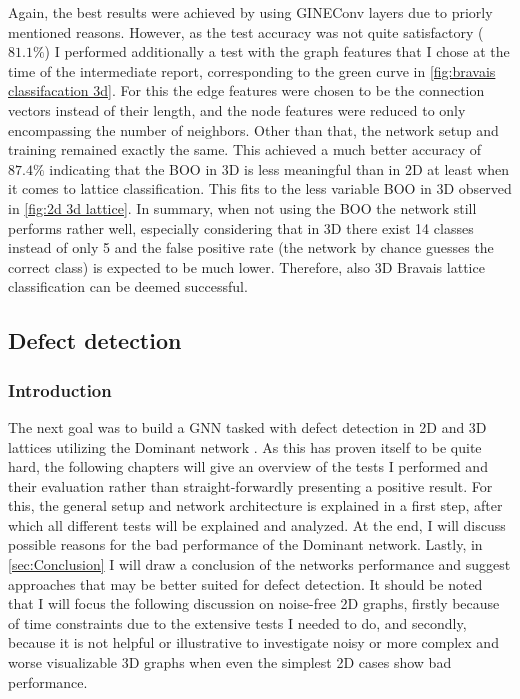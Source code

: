 \documentclass[11pt,a4paper]{article}
\begin{document}
Again, the best results were achieved by using GINEConv layers due to priorly mentioned reasons. 
However, as the test accuracy was not quite satisfactory ($81.1\%$) I performed additionally a test with the graph features that I chose at the time of the intermediate report, corresponding to the green curve in \autoref{fig:bravais classifacation 3d}. 
For this the edge features were chosen to be the connection vectors instead of their length, and the node features were reduced to only encompassing the number of neighbors. 
Other than that, the network setup and training remained exactly the same. 
This achieved a much better accuracy of $87.4\%$ indicating that the BOO in 3D is less meaningful than in 2D at least when it comes to lattice classification. 
This fits to the less variable BOO in 3D observed in \autoref{fig:2d 3d lattice}. 
In summary, when not using the BOO the network still performs rather well, especially considering that in 3D there exist 14 classes instead of only 5 and the false positive rate (the network by chance guesses the correct class) is expected to be much lower. 
Therefore, also 3D Bravais lattice classification can be deemed successful. 

\subsection{Defect detection}
\label{ssec:Defect detection}
\subsubsection{Introduction}
The next goal was to build a GNN tasked with defect detection in 2D and 3D lattices utilizing the Dominant network \cite{dingDeepAnomalyDetection2019}. 
As this has proven itself to be quite hard, the following chapters will give an overview of the tests I performed and their evaluation rather than straight-forwardly presenting a positive result. 
For this, the general setup and network architecture is explained in a first step, after which all different tests will be explained and analyzed. 
At the end, I will discuss possible reasons for the bad performance of the Dominant network.
Lastly, in \autoref{sec:Conclusion} I will draw a conclusion of the networks performance and suggest approaches that may be better suited for defect detection. 
It should be noted that I will focus the following discussion on noise-free 2D graphs, firstly because of time constraints due to the extensive tests I needed to do, and secondly, because it is not helpful or illustrative to investigate noisy or more complex and worse visualizable 3D graphs when even the simplest 2D cases show bad performance. \\
\end{document}
